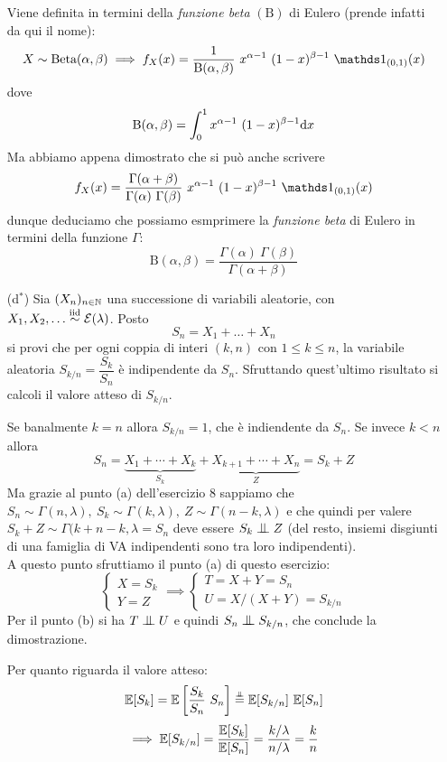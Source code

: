 \begin{enumerate}
\begin{oss}
Viene definita in termini della \emph{funzione beta} $(\mathrm{B})$ di Eulero (prende infatti da qui il nome):
\[
X\sim\text{Beta}(\alpha,\beta)\implies f_X(x)=\frac{1}{\mathrm{B}(\alpha,\beta)}\ x^{\alpha-1}\ (1-x)^{\beta-1}\ \Ind_{(0,1)}(x)
\]
dove
\[
\mathrm{B}(\alpha,\beta)=\int_0^1 x^{\alpha-1}\ (1-x)^{\beta-1}\dx
\]
Ma abbiamo appena dimostrato che si può anche scrivere
\[
f_X(x)=\frac{\Gamma(\alpha+\beta)}{\Gamma(\alpha)\ \Gamma(\beta)}\ x^{\alpha-1}\ (1-x)^{\beta-1}\ \Ind_{(0,1)}(x)
\]
dunque deduciamo che possiamo esmprimere la \emph{funzione beta} di Eulero in termini della funzione $\Gamma$:
\[
\mathrm{B}(\alpha,\beta)=\frac{\Gamma(\alpha)\ \Gamma(\beta)}{\Gamma(\alpha+\beta)}
\]
\end{oss}

\item [(d$^\ast$)] Sia $(X_n)_{n\in\mathbb{N}}$ una successione di variabili aleatorie, con $X_1,X_2,\dots\stackrel{\mathrm{iid}}{\sim}\mathcal{E}(\lambda)$. Posto
\[
S_n=X_1+\dots+X_n
\]
si provi che per ogni coppia di interi $(k,n)$ con $1\leq k\leq n$, la variabile aleatoria $S_{k/n}=\dfrac{S_k}{S_n}$ è indipendente da $S_n$. Sfruttando quest'ultimo risultato si calcoli il valore atteso di $S_{k/n}$.

Se banalmente $k=n$ allora $S_{k/n}=1$, che è indiendente da $S_{n}$. Se invece $k<n$ allora 
\[
S_n=\underbrace{X_1+\cdots+X_k}_{S_k}+\underbrace{X_{k+1}+\cdots+X_n}_{Z}=S_k+Z
\]
Ma grazie al punto (a) dell'esercizio 8 sappiamo che $S_n\sim\Gamma(n,\lambda),\ S_k\sim\Gamma(k,\lambda),\ Z\sim\Gamma(n-k,\lambda)$ e che quindi per valere $S_k+Z\sim\Gamma(k+n-k,\lambda=S_n$ deve essere $S_k\indep Z$ (del resto, insiemi disgiunti di una famiglia di VA indipendenti sono tra loro indipendenti). \\
A questo punto sfruttiamo il punto (a) di questo esercizio:
\[
\begin{cases}
X=S_k \\
Y=Z
\end{cases}
\implies
\begin{cases}
T=X+Y=S_n \\
U=X/(X+Y)=S_{k/n}
\end{cases}
\]
Per il punto (b) si ha $T\indep U$ e quindi $S_n\indep S_{k/n}$, che conclude la dimostrazione.

Per quanto riguarda il valore atteso:
\[
\EE[S_k]=\EE\left[\frac{S_k}{S_n}\ S_n   \right]\overset{\underset{\indep}{}}{=}\EE[S_{k/n}]\ \EE[S_n]
\]
\[
\implies \mathbb{E}[S_{k/n}]=\frac{\mathbb{E}[S_k]}{\mathbb{E}[S_n]}=\frac{k/\lambda}{n/\lambda}=\frac{k}{n}
\]
\end{enumerate}

\Soluzione{} %

\Soluzione{} %

\Soluzione{} %

\Soluzione{} %

\Soluzione{} %

\Soluzione{} %

\Soluzione{} %

\Soluzione{} %

\Soluzione{} %

\Soluzione{} %

\Soluzione{} %

\Soluzione{} %

\Soluzione{} %